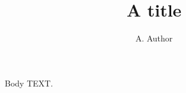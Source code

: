 \documentclass[epjc3]{svjour3}
\begin{document}
\title{A title}
\author{A. Author}
\maketitle
Body TEXT.
\end{document}
